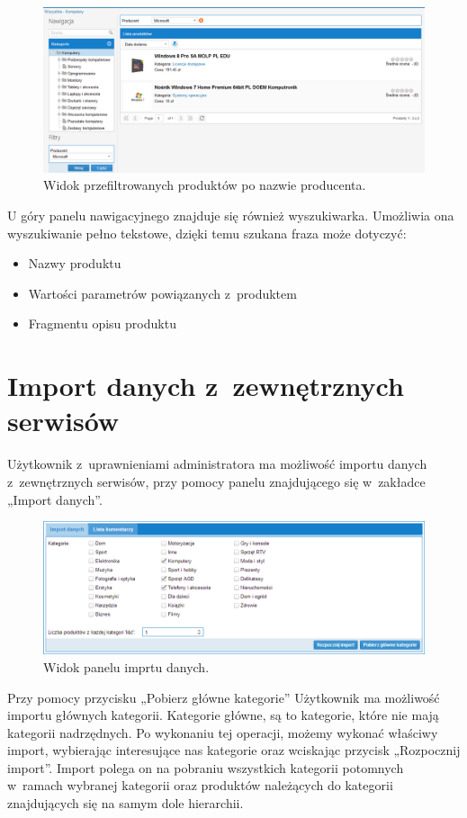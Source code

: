 \begin{figure}[h]
	\centering
	\includegraphics[width=1.00\textwidth]{images/po_nalozeniu_filtru_kategoria.png}
	\caption{Widok przefiltrowanych produktów po nazwie producenta.}
\end{figure}

\newpage

U góry panelu nawigacyjnego znajduje się również wyszukiwarka. Umożliwia ona wyszukiwanie pełno tekstowe, dzięki temu szukana fraza może dotyczyć:

\begin{itemize}
\item Nazwy produktu
\item Wartości parametrów powiązanych z~produktem
\item Fragmentu opisu produktu
\end{itemize}

\section{Import danych z~zewnętrznych serwisów}

Użytkownik z~uprawnieniami administratora ma możliwość importu danych z~zewnętrznych serwisów, przy pomocy panelu znajdującego się w~zakładce „Import danych”.

\begin{figure}[h]
	\centering
	\includegraphics[width=1.00\textwidth]{images/Import.PNG}
	\caption{Widok panelu imprtu danych.}
\end{figure}

Przy pomocy przycisku „Pobierz główne kategorie” Użytkownik ma możliwość importu głównych kategorii. Kategorie główne, są to kategorie, które nie mają kategorii nadrzędnych. Po wykonaniu tej operacji, możemy wykonać właściwy import, wybierając interesujące nas kategorie oraz wciskając przycisk „Rozpocznij import”.\linebreak 
Import polega on na pobraniu wszystkich kategorii potomnych w~ramach wybranej kategorii oraz produktów należących do kategorii znajdujących się na samym dole hierarchii.

